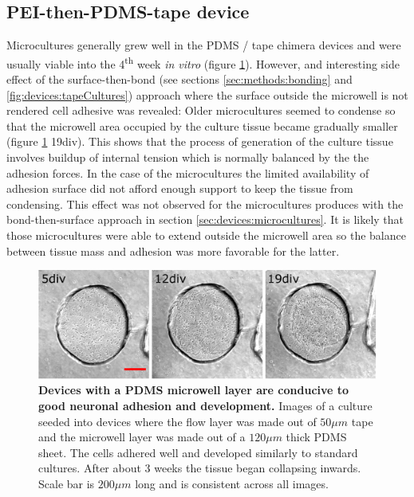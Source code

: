     \subsection{PEI-then-PDMS-tape device}
    Microcultures generally grew well in the PDMS / tape chimera devices and were usually viable into the 4\textsuperscript{th} week \textit{in vitro} (figure \ref{fig:pulses:PDMSMicroculture}). However, and interesting side effect of the surface-then-bond (see sections \ref{sec:methods:bonding} and \ref{fig:devices:tapeCultures}) approach where the surface outside the microwell is not rendered cell adhesive was revealed: Older microcultures seemed to condense so that the microwell area occupied by the culture tissue became gradually smaller (figure \ref{fig:pulses:PDMSMicroculture} 19div). This shows that the process of generation of the culture tissue involves buildup of internal tension which is normally balanced by the the adhesion forces. In the case of the microcultures the limited availability of adhesion surface did not afford enough support to keep the tissue from condensing. This effect was not observed for the microcultures produces with the bond-then-surface approach in section \ref{sec:devices:microcultures}. It is likely that those microcultures were able to extend outside the microwell area so the balance between tissue mass and adhesion was more favorable for the latter.

    \begin{figure}[h]
       \centering
       \includegraphics[width=15cm]{chapter6/figures/PDMSMicroculture/PDMSMicroculture.jpg}
        \caption[Development of microcultures is hybrid PDMS-tape devices]{\textbf{Devices with a PDMS microwell layer are conducive to good neuronal adhesion and development.} Images of a culture seeded into devices where the flow layer was made out of \(50\mu m\) tape and the microwell layer was made out of a \(120 \mu m\) thick PDMS sheet. The cells adhered well and developed similarly to standard cultures. After about 3 weeks the tissue began collapsing inwards. Scale bar is \(200 \mu m\) long and is consistent across all images.}
       \label{fig:pulses:PDMSMicroculture}
   \end{figure}

